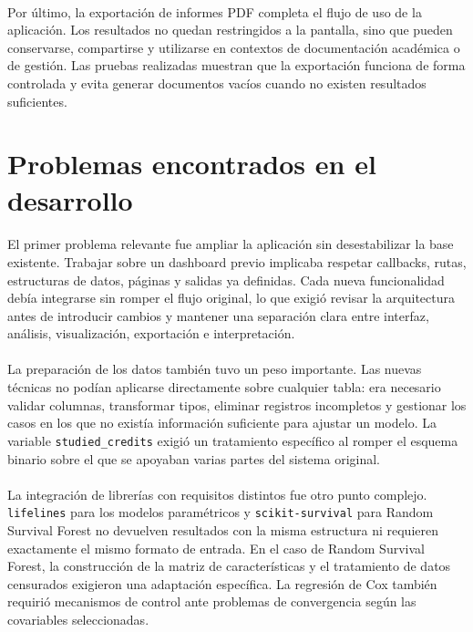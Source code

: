 \paragraph*{}Por último, la exportación de informes PDF completa el flujo de uso de la aplicación. Los resultados no quedan restringidos a la pantalla, sino que pueden conservarse, compartirse y utilizarse en contextos de documentación académica o de gestión. Las pruebas realizadas muestran que la exportación funciona de forma controlada y evita generar documentos vacíos cuando no existen resultados suficientes.

\section{Problemas encontrados en el desarrollo}

\paragraph*{}El primer problema relevante fue ampliar la aplicación sin desestabilizar la base existente. Trabajar sobre un dashboard previo implicaba respetar callbacks, rutas, estructuras de datos, páginas y salidas ya definidas. Cada nueva funcionalidad debía integrarse sin romper el flujo original, lo que exigió revisar la arquitectura antes de introducir cambios y mantener una separación clara entre interfaz, análisis, visualización, exportación e interpretación.

\paragraph*{}La preparación de los datos también tuvo un peso importante. Las nuevas técnicas no podían aplicarse directamente sobre cualquier tabla: era necesario validar columnas, transformar tipos, eliminar registros incompletos y gestionar los casos en los que no existía información suficiente para ajustar un modelo. La variable \texttt{studied\_credits} exigió un tratamiento específico al romper el esquema binario sobre el que se apoyaban varias partes del sistema original.

\paragraph*{}La integración de librerías con requisitos distintos fue otro punto complejo. \texttt{lifelines} para los modelos paramétricos y \texttt{scikit-survival} para Random Survival Forest no devuelven resultados con la misma estructura ni requieren exactamente el mismo formato de entrada. En el caso de Random Survival Forest, la construcción de la matriz de características y el tratamiento de datos censurados exigieron una adaptación específica. La regresión de Cox también requirió mecanismos de control ante problemas de convergencia según las covariables seleccionadas.

